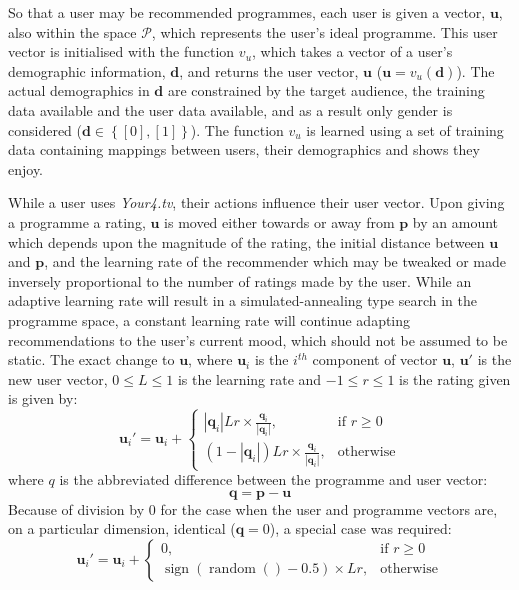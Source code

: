 		So that a user may be recommended programmes, each user is given a vector, $\mathbf{u}$, also within the space $\mathcal{P}$, which represents the user's ideal programme. This user vector is initialised with the function $v_u$, which takes a vector of a user's demographic information, $\mathbf{d}$, and returns the user vector, $\mathbf{u}$ ($\mathbf{u} = v_u(\mathbf{d})$). The actual demographics in $\mathbf{d}$ are constrained by the target audience, the training data available and the user data available, and as a result only gender is considered ($\mathbf{d} \in \left\{{ \left[ 0\right] ,\left[ 1\right] }\right\} $). The function $v_u$ is learned using a set of training data containing mappings between users, their demographics and shows they enjoy.

		While a user uses \textit{Your4.tv}, their actions influence their user vector. Upon giving a programme a rating, $\mathbf{u}$ is moved either towards or away from $\mathbf{p}$ by an amount which depends upon the magnitude of the rating, the initial distance between $\mathbf{u}$ and $\mathbf{p}$, and the learning rate of the recommender which may be tweaked or made inversely proportional to the number of ratings made by the user. While an adaptive learning rate will result in a simulated-annealing type search in the programme space, a constant learning rate will continue adapting recommendations to the user's current mood, which should not be assumed to be static. The exact change to $\mathbf{u}$, where $\mathbf{u}_{i}$ is the $i^{th}$ component of vector $\mathbf{u}$, $\mathbf{u}'$ is the new user vector, $0 \leq L \leq 1$ is the learning rate and $-1 \leq r \leq 1$ is the rating given is given by:
		$$
			\mathbf{u}_{i}' =
			\mathbf{u}_{i} + \begin{cases}
				\left|\mathbf{q}_i\right|Lr \times \frac{\mathbf{q}_i}{\left|\mathbf{q}_i\right|},&
					\text{if } r\geq 0\\
				(1-\left|\mathbf{q}_i\right|)Lr \times \frac{\mathbf{q}_i}{\left|\mathbf{q}_i\right|},&
					\text{otherwise}
			\end{cases}
		$$
		where $q$ is the abbreviated difference between the programme and user vector:
		$$
			\mathbf{q} = \mathbf{p}-\mathbf{u}
		$$
		Because of division by 0 for the case when the user and programme vectors are, on a particular dimension, identical ($\mathbf{q}=0$), a special case was required:
		$$
			\mathbf{u}_{i}' =
			\mathbf{u}_{i} + \begin{cases}
				0,&
					\text{if } r\geq 0\\
				\operatorname{sign}(\operatorname{random}()-0.5)\times Lr,&
					\text{otherwise}
			\end{cases}
		$$


